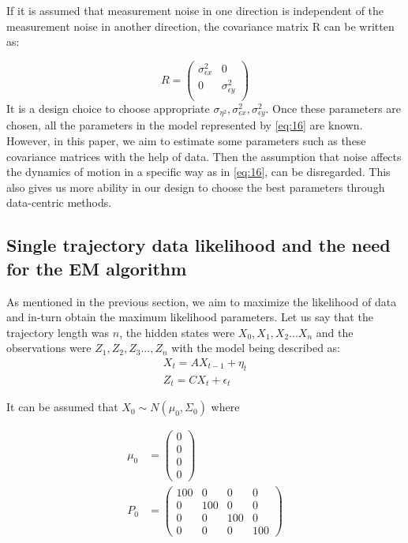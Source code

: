 \documentclass{article}
\begin{document}
If it is assumed that measurement noise in one direction is independent of the measurement noise in another direction, the covariance matrix R can be written as:

\begin{equation}\label{eq:19}
    R=\begin{pmatrix}
    \sigma_{\epsilon x}^2 & 0\\
     0 & \sigma_{\epsilon y}^2\\
    \end{pmatrix}
\end{equation}
It is a design choice to choose appropriate $\sigma_{\eta^2}, \sigma_{\epsilon x}^2, \sigma_{\epsilon y}^2$. Once these parameters are chosen, all the parameters in the model represented by \ref{eq:16} are known. However, in this paper, we aim to estimate some parameters such as these covariance matrices with the help of data. Then the assumption that noise affects the dynamics of motion in a specific way as in \ref{eq:16}, can be disregarded. This also gives us more ability in our design to choose the best parameters through data-centric methods. 

\subsection{Single trajectory data likelihood and the need for the EM algorithm}
As mentioned in the previous section, we aim to maximize the likelihood of data and in-turn obtain the maximum likelihood parameters. Let us say that the trajectory length was $n$, the hidden states were ${X_0,X_1,X_2...X_n}$ and the observations were ${Z_1,Z_2,Z_3...,Z_n}$ with the model being described as:
\begin{equation} \label{eq:20}
\begin{split}
      X_{t}=AX_{t-1} + \eta_t \\ 
      Z_{t}=CX_{t}+\epsilon_t  
\end{split}
\end{equation}

It can be assumed that $X_0 \sim N(\mu_0,\Sigma_0)$ where  

\begin{equation}\label{eq:init1}
\begin{split}
    \mu_0 &= \begin{pmatrix}
    0\\
     0 \\
     0\\
     0
     \end{pmatrix}\\
     P_0 &= \begin{pmatrix}
    100 & 0 & 0 & 0\\
     0 & 100 & 0 & 0 \\
     0 & 0 & 100 & 0\\
     0 & 0 & 0 & 100
    \end{pmatrix}
\end{split}
\end{equation}
\end{document}
